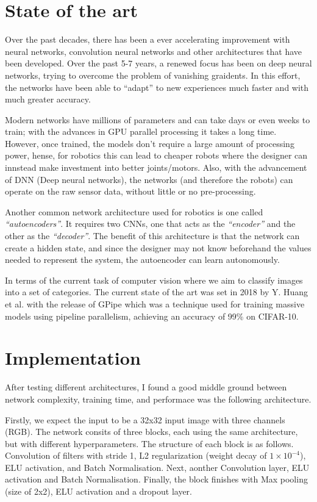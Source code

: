 \documentclass[12pt]{article}
\begin{document}
\section{State of the art}
\label{sec:soa}
Over the past decades, there has been a ever accelerating improvement with neural networks, convolution neural networks and other architectures that have been developed. Over the past 5-7 years, a renewed focus has been on deep neural networks, trying to overcome the problem of vanishing graidents. In this effort, the networks have been able to ``adapt'' to new experiences much faster and with much greater accuracy. \cite{imagenet, howard2019searching}

Modern networks have millions of parameters and can take days or even weeks to train; with the advances in GPU parallel processing it takes a long time. However, once trained, the models don't require a large amount of processing power, hense, for robotics this can lead to cheaper robots where the designer can innstead make investment into better joints/motors. Also, with the advancement of DNN (Deep neural networks), the networks (and therefore the robots) can operate on the raw sensor data, without little or no pre-processing.

Another common network architecture used for robotics is one called \textit{``autoencoders''}. It requires two CNNs, one that acts as the \textit{``encoder''} and the other as the \textit{``decoder''}. The benefit of this architecture is that the network can create a hidden state, and since the designer may not know beforehand the values needed to represent the system, the autoencoder can learn autonomously.

In terms of the current task of computer vision where we aim to classify images into a set of categories. The current state of the art was set in 2018 by Y. Huang et al. with the release of GPipe which was a technique used for training massive models using pipeline parallelism, achieving an accuracy of 99\% on CIFAR-10.


\section{Implementation}
\label{sec:imple}
After testing different architectures, I found a good middle ground between network complexity, training time, and performace was the following architecture.

Firstly, we expect the input to be a 32x32 input image with three channels (RGB). The network consits of three blocks, each using the same architecture, but with different hyperparameters. The structure of each block is as follows. Convolution of filters with stride 1, L2 regularization (weight decay of $1\times 10^{-4}$), ELU activation, and Batch Normalisation. Next, aonther Convolution layer, ELU activation and Batch Normalisation. Finally, the block finishes with Max pooling (size of 2x2), ELU activation and a dropout layer.
\end{document}
